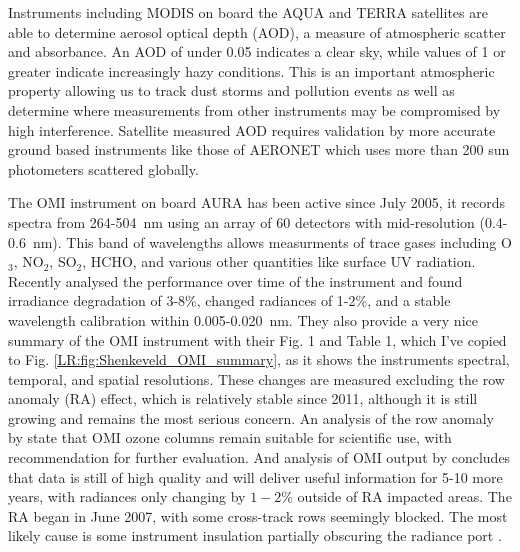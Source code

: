     Instruments including MODIS on board the AQUA and TERRA satellites are able to determine aerosol optical depth (AOD), a measure of atmospheric scatter and absorbance. 
    An AOD of under 0.05 indicates a clear sky, while values of 1 or greater indicate increasingly hazy conditions.
    This is an important atmospheric property allowing us to track dust storms and pollution events as well as determine where measurements from other instruments may be compromised by high interference.
    Satellite measured AOD requires validation by more accurate ground based instruments like those of AERONET which uses more than 200 sun photometers scattered globally. 
    
    The OMI instrument on board AURA has been active since July 2005, it records spectra from 264-504~nm using an array of 60 detectors with mid-resolution (0.4-0.6~nm).
    This band of wavelengths allows measurments of trace gases including O$_3$, NO$_2$, SO$_2$, HCHO, and various other quantities like surface UV radiation.
    Recently \cite{Schenkeveld2017} analysed the performance over time of the instrument and found irradiance degradation of 3-8\%, changed radiances of 1-2\%, and a stable wavelength calibration within 0.005-0.020~nm.
    They also provide a very nice summary of the OMI instrument with their Fig. 1 and Table 1, which I've copied to Fig. \ref{LR:fig:Shenkeveld_OMI_summary}, as it shows the instruments spectral, temporal, and spatial resolutions.
    These changes are measured excluding the row anomaly (RA) effect, which is relatively stable since 2011, although it is still growing and remains the most serious concern.
    An analysis of the row anomaly by \cite{Huang2017} state that OMI ozone columns remain suitable for scientific use, with recommendation for further evaluation.
    And analysis of OMI output by \cite{Schenkeveld2017} concludes that data is still of high quality and will deliver useful information for 5-10 more years, with radiances only changing by $1-2\%$ outside of RA impacted areas.
    The RA began in June 2007, with some cross-track rows seemingly blocked. The most likely cause is some instrument insulation partially obscuring the radiance port \citep{Schenkeveld2017}.
    
